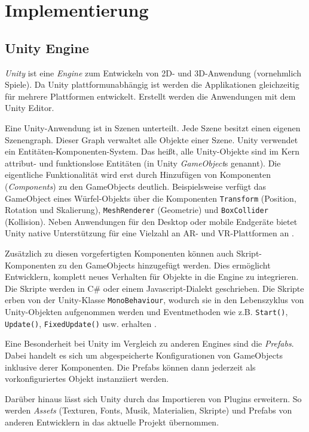 \chapter{Implementierung}
\label{chap:implementation}

\section{Unity Engine}
\emph{Unity} \autocite{UnityTechnologies2018} ist eine \emph{Engine} zum Entwickeln von 2D- und 3D-Anwendung (vornehmlich Spiele).
Da Unity plattformunabhängig ist werden die Applikationen gleichzeitig für mehrere Plattformen entwickelt.
Erstellt werden die Anwendungen mit dem Unity Editor.

Eine Unity-Anwendung ist in Szenen unterteilt.
Jede Szene besitzt einen eigenen Szenengraph.
Dieser Graph verwaltet alle Objekte einer Szene.
Unity verwendet ein Entitäten-Komponenten-System.
Das heißt, alle Unity-Objekte sind im Kern attribut- und funktionslose Entitäten (in Unity \emph{GameObject}s genannt).
Die eigentliche Funktionalität wird erst durch Hinzufügen von Komponenten (\emph{Components}) zu den GameObjects deutlich.
Beispielsweise verfügt das GameObject eines Würfel-Objekts über die Komponenten \lstinline{Transform} (Position, Rotation und Skalierung), \lstinline{MeshRenderer} (Geometrie) und \lstinline{BoxCollider} (Kollision).
Neben Anwendungen für den Desktop oder mobile Endgeräte bietet Unity native Unterstützung für eine Vielzahl an AR- und VR-Plattformen an \parencite{UnityTechnologies2018b}.

Zusätzlich zu diesen vorgefertigten Komponenten können auch Skript-Komponenten zu den GameObjects hinzugefügt werden.
Dies ermöglicht Entwicklern, komplett neues Verhalten für Objekte in die Engine zu integrieren.
Die Skripte werden in C\# oder einem Javascript-Dialekt geschrieben.
Die Skripte erben von der Unity-Klasse \lstinline|MonoBehaviour|, wodurch sie in den Lebenszyklus von Unity-Objekten aufgenommen werden und Eventmethoden wie z.B. \lstinline|Start()|, \lstinline|Update()|, \lstinline|FixedUpdate()| usw. erhalten \parencite{UnityTechnologies2018c}.

Eine Besonderheit bei Unity im Vergleich zu anderen Engines sind die \emph{Prefabs}.
Dabei handelt es sich um abgespeicherte Konfigurationen von GameObjects inklusive derer Komponenten.
Die Prefabs können dann jederzeit als vorkonfiguriertes Objekt instanziiert werden.

Darüber hinaus lässt sich Unity durch das Importieren von Plugins erweitern.
So werden \emph{Assets} (Texturen, Fonts, Musik, Materialien, Skripte) und Prefabs von anderen Entwicklern in das aktuelle Projekt übernommen.

